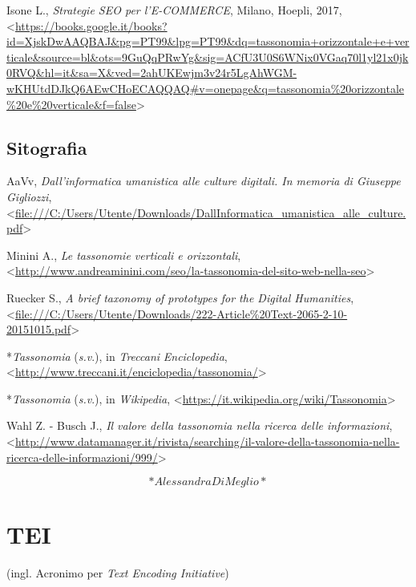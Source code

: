 \documentclass[
  b5paper,
  twoside,
  11pt,
  chapterprefix=false,
  bibliography=totocnumbered,
  parskip=0]{scrbook}
\begin{document}
Isone L., \emph{Strategie SEO per l'E-COMMERCE}, Milano, Hoepli, 2017,
\textless{}{\url{https://books.google.it/books?id=XjskDwAAQBAJ\&pg=PT99\&lpg=PT99\&dq=tassonomia+orizzontale+e+verticale\&source=bl\&ots=9GuQqPRwYg\&sig=ACfU3U0S6WNix0VGaq70l1yl21x0jk0RVQ\&hl=it\&sa=X\&ved=2ahUKEwjm3v24r5LgAhWGM-wKHUtdDJkQ6AEwCHoECAQQAQ\#v=onepage\&q=tassonomia\%20orizzontale\%20e\%20verticale\&f=false}\textgreater{}}

\hypertarget{sitografia-30}{%
\section*{Sitografia}\label{sitografia-30}}

AaVv, \emph{Dall'informatica umanistica alle culture digitali. In memoria di
Giuseppe Gigliozzi},
\textless{}{\url{file:///C:/Users/Utente/Downloads/DallInformatica_umanistica_alle_culture.pdf}\textgreater{}}

Minini A., \emph{Le tassonomie verticali e orizzontali},
\textless{}{\url{http://www.andreaminini.com/seo/la-tassonomia-del-sito-web-nella-seo}\textgreater{}}

Ruecker S., \emph{A brief taxonomy of prototypes for the Digital Humanities},
\textless{}{\href{file:///C:/Users/Utente/Downloads/222-Article\%20Text-2065-2-10-20151015.pdf}{file:///C:/Users/Utente/Downloads/222-Article\%20Text-2065-2-10-20151015.pdf}\textgreater{}}

*\emph{Tassonomia} (\emph{s.v}.), in \emph{Treccani} \emph{Enciclopedia},
\textless{}\href{http://www.treccani.it/enciclopedia/tassonomia/}{{http://www.treccani.it/enciclopedia/tassonomia/}}\textgreater{}

*\emph{Tassonomia} (\emph{s.v}.), in \emph{Wikipedia},
\textless{}{\url{https://it.wikipedia.org/wiki/Tassonomia}\textgreater{}}

Wahl Z. - Busch J., \emph{Il valore della tassonomia nella ricerca delle
informazioni},
\textless{}{\url{http://www.datamanager.it/rivista/searching/il-valore-della-tassonomia-nella-ricerca-delle-informazioni/999/}\textgreater{}}

\[*Alessandra Di Meglio*\]

\hypertarget{tei}{%
\chapter{TEI}\label{tei}}

(ingl. Acronimo per \emph{Text Encoding Initiative})
\end{document}
